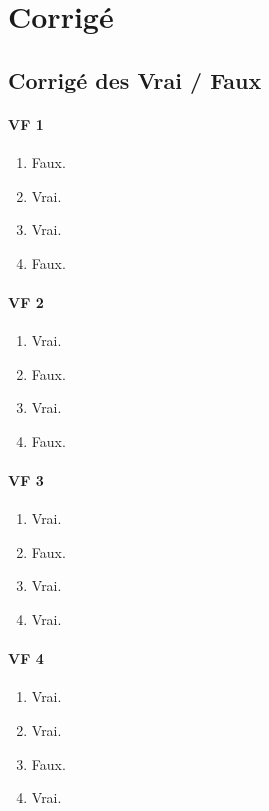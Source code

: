\documentclass[11pt,a4paper]{article}
\theoremstyle{definition}
\begin{document}
\newpage

\section{Corrigé}

\subsection{Corrigé des Vrai / Faux}

\paragraph{VF 1}
\begin{enumerate}[label=\alph*)]
    \item Faux.
    \item Vrai.
    \item Vrai.
    \item Faux.
\end{enumerate}

\paragraph{VF 2}
\begin{enumerate}[label=\alph*)]
    \item Vrai.
    \item Faux.
    \item Vrai.
    \item Faux.
\end{enumerate}

\paragraph{VF 3}
\begin{enumerate}[label=\alph*)]
    \item Vrai.
    \item Faux.
    \item Vrai.
    \item Vrai.
\end{enumerate}

\paragraph{VF 4}
\begin{enumerate}[label=\alph*)]
    \item Vrai.
    \item Vrai.
    \item Faux.
    \item Vrai.
\end{enumerate}
\end{document}
